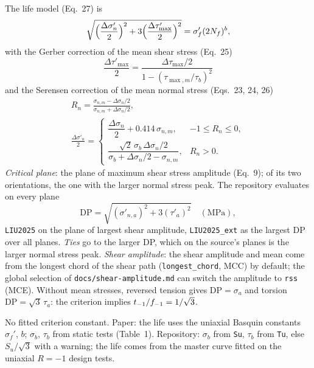  The life model (Eq.~27) is
\begin{equation}
\sqrt{\Bigl(\frac{\Delta\sigma'_n}{2}\Bigr)^2 + 3\Bigl(\frac{\Delta\tau'_{\max}}{2}\Bigr)^2} = \sigma_f'(2N_f)^b ,
\label{eq:l25}
\end{equation}
with the Gerber correction of the mean shear stress (Eq.~25)
\begin{equation}
\frac{\Delta\tau'_{\max}}{2} = \frac{\Delta\tau_{\max}/2}{1-(\tau_{\max,m}/\tau_b)^2}
\label{eq:l25-gerber}
\end{equation}
and the Serensen correction of the mean normal stress (Eqs.~23, 24, 26)
\begin{gather}
R_n = \frac{\sigma_{n,m}-\Delta\sigma_n/2}{\sigma_{n,m}+\Delta\sigma_n/2} , \label{eq:l25-rn}\\
\frac{\Delta\sigma'_n}{2} =
\begin{cases}
\dfrac{\Delta\sigma_n}{2} + 0.414\,\sigma_{n,m}, & -1\le R_n\le0,\\[2mm]
\dfrac{\sqrt2\,\sigma_b\,\Delta\sigma_n/2}{\sigma_b+\Delta\sigma_n/2-\sigma_{n,m}}, & R_n>0 .
\end{cases}
\label{eq:l25-serensen}
\end{gather}
\emph{Critical plane}: the plane of maximum shear stress amplitude (Eq.~9); of its two orientations,
the one with the larger normal stress peak. The repository evaluates on every plane
\begin{equation}
\mathrm{DP} = \sqrt{(\sigma'_{n,a})^2 + 3(\tau'_a)^2}\quad(\mathrm{MPa}),
\label{eq:l25-dp}
\end{equation}
\texttt{LIU2025} on the plane of largest shear amplitude, \texttt{LIU2025\_ext} as the largest DP over
all planes. \emph{Ties} go to the larger DP, which on the source's planes is the larger normal stress
peak. \emph{Shear amplitude}: the shear amplitude and mean come from the longest chord of the shear
path (\texttt{longest\_chord}, MCC) by default; the global selection of \texttt{docs/shear-amplitude.md}
can switch the amplitude to \texttt{rss} (MCE). Without mean stresses, reversed tension gives
$\mathrm{DP}=\sigma_a$ and torsion $\mathrm{DP}=\sqrt3\,\tau_a$: the criterion implies
$t_{-1}/f_{-1}=1/\sqrt3$.

 No fitted criterion constant. Paper: the life uses the uniaxial
Basquin constants $\sigma_f'$, $b$; $\sigma_b$, $\tau_b$ from static tests (Table~1). Repository:
$\sigma_b$ from \texttt{Su}, $\tau_b$ from \texttt{Tu}, else $S_u/\sqrt3$ with a warning; the life
comes from the master curve fitted on the uniaxial $R=-1$ design tests.

